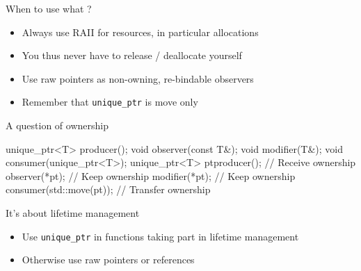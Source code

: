 \begin{frame}[fragile]
  \begin{block}{When to use what ?}
    \begin{itemize}
    \item Always use RAII for resources, in particular allocations
    \item You thus never have to release / deallocate yourself
    \item Use raw pointers as non-owning, re-bindable observers
    \item Remember that \texttt{unique_ptr} is move only
    \end{itemize}
  \end{block}
  \pause
  \begin{exampleblock}{A question of ownership}
    \begin{cppcode*}{}
      unique_ptr<T> producer();
      void observer(const T&);
      void modifier(T&);
      void consumer(unique_ptr<T>);
      unique_ptr<T> pt{producer()}; // Receive ownership
      observer(*pt);                // Keep ownership
      modifier(*pt);                // Keep ownership
      consumer(std::move(pt));      // Transfer ownership
    \end{cppcode*}
  \end{exampleblock}
\end{frame}

\begin{frame}[fragile]
  \begin{block}{It's about lifetime management}
    \begin{itemize}
    \item Use \texttt{unique_ptr} in functions taking part in lifetime management
    \item Otherwise use raw pointers or references
    \end{itemize}
  \end{block}
\end{frame}


